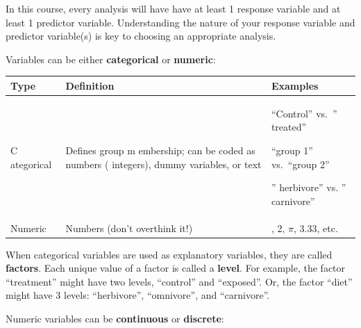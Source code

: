 \documentclass[
  13,
  letterpaper,
]{report}
\begin{document}
In this course, every analysis will have have at least 1 response
variable and at least 1 predictor variable. Understanding the nature of
your response variable and predictor variable(s) is key to choosing an
appropriate analysis.

Variables can be either \textbf{categorical} or \textbf{numeric}:

\begin{longtable}[]{@{}
  >{\raggedright\arraybackslash}p{}
  >{\raggedright\arraybackslash}p{}
  >{\raggedright\arraybackslash}p{}@{}}
\toprule\noalign{}
\begin{minipage}[b]{\linewidth}\raggedright
Type
\end{minipage} & \begin{minipage}[b]{\linewidth}\raggedright
Definition
\end{minipage} & \begin{minipage}[b]{\linewidth}\raggedright
Examples
\end{minipage} \\
\midrule\noalign{}
\endhead
\bottomrule\noalign{}
\endlastfoot
C ategorical & Defines group m embership; can be coded as numbers (
integers), dummy variables, or text & ``Control'' vs.~'' treated''

``group 1'' vs.~``group 2''

'' herbivore'' vs. '' carnivore'' \\
Numeric & Numbers (don't overthink it!) & 1, 2, \(\pi\), 3.33, etc. \\
\end{longtable}

When categorical variables are used as explanatory variables, they are
called \textbf{factors}. Each unique value of a factor is called a
\textbf{level}. For example, the factor ``treatment'' might have two
levels, ``control'' and ``exposed''. Or, the factor ``diet'' might have
3 levels: ``herbivore'', ``omnivore'', and ``carnivore''.

Numeric variables can be \textbf{continuous} or \textbf{discrete}:
\end{document}
